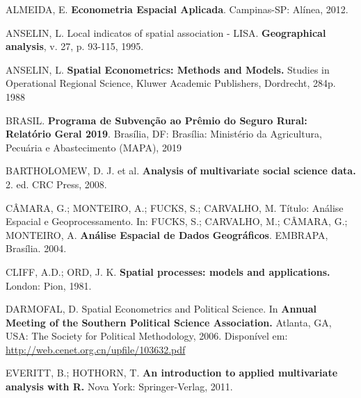 \documentclass[12pt, a4paper,brazil,oneside]{article}
\begin{document}
	\newpage
	
	\providecommand{\abntreprintinfo}[1]{%
		\citeonline{#1}}
	\setlength{\labelsep}{0pt}
	\begin{thebibliography}{99}
		\providecommand{\abntrefinfo}[3]{}
		\providecommand{\abntbstabout}[1]{}
		\abntbstabout{v-1.9.6 }
		
		\abntrefinfo{almeida12}{ALMEIDA}{2012}
		{ALMEIDA, E. \textbf{Econometria Espacial Aplicada}. Campinas-SP: Alínea, 2012.}
		
		\abntrefinfo{anselin95}{ANSELIN}{1995}
		{ANSELIN, L. Local indicatos of spatial association - LISA. \textbf{Geographical analysis}, v. 27, p. 93-115, 1995.}
		
		\abntrefinfo{anselin88}{ANSELIN}{1988}
		{ANSELIN, L. \textbf{Spatial Econometrics: Methods and Models.} Studies in Operational 	Regional Science, Kluwer Academic Publishers, Dordrecht, 284p. 1988}
		
		\abntrefinfo{brasil19}{BRASIL}{2019}
		{BRASIL. \textbf{Programa de Subvenção ao Prêmio do Seguro Rural: Relatório Geral 2019}. Brasília, DF: Brasília: Ministério da Agricultura, Pecuária e Abastecimento (MAPA), 2019}
		
		\abntrefinfo{bartholomew08}{BARTHOLOMEW}{2008}
		{BARTHOLOMEW, D. J. et al. \textbf{Analysis of multivariate social science data.} 2. ed. CRC Press, 2008.}
		
		\abntrefinfo{camara04}{CÂMARA et al.}{2004}
		{CÂMARA, G.; MONTEIRO, A.; FUCKS, S.; CARVALHO, M. Título: Análise Espacial e Geoprocessamento. In: FUCKS, S.; CARVALHO, M.; CÂMARA, G.; MONTEIRO, A. \textbf{Análise Espacial de Dados Geográficos}. EMBRAPA, Brasília. 2004.}
		
		\abntrefinfo{cliff81}{CLIFF}{1981}
		{CLIFF, A.D.; ORD, J. K. \textbf{Spatial processes: models and applications.} London: Pion, 1981.}
		
		\abntrefinfo{darmofal06}{DARMOFAL}{2006}
		DARMOFAL, D. Spatial Econometrics and Political Science. In \textbf{Annual Meeting of the Southern Political Science Association.}  Atlanta, GA, USA: The Society for Political Methodology, 2006. Disponível em: \url{http://web.cenet.org.cn/upfile/103632.pdf}
		
		\abntrefinfo{everitt11}{EVERITT}{2011}
		{EVERITT, B.; HOTHORN, T. \textbf{An introduction to applied multivariate analysis with R.} Nova York: Springer-Verlag, 2011.}
		

\end{thebibliography}
\end{document}
